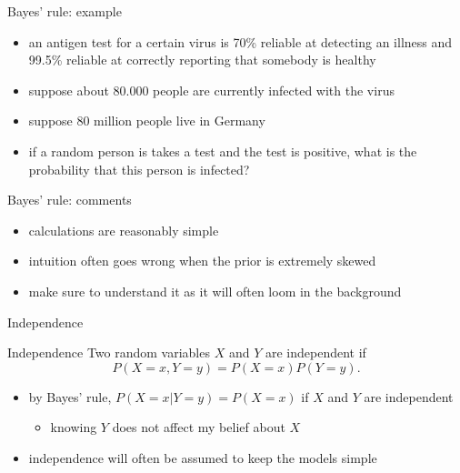 \documentclass[bigger]{beamer}
\begin{document}
\begin{frame}[label={sec:orgcfbb15d}]{Bayes' rule: example}
\begin{itemize}
\item an antigen test for a certain virus is 70\% reliable at detecting an illness and 99.5\% reliable at correctly reporting that somebody is healthy
\item suppose about 80.000 people are currently infected with the virus
\item suppose 80 million people live in Germany
\item if a random person is takes a test and the test is positive, what is the probability that this person is infected?
\end{itemize}
\end{frame}
\begin{frame}[label={sec:org8d2acd6}]{Bayes' rule: comments}
\begin{itemize}
\item calculations are reasonably simple
\item intuition often goes wrong when the prior is extremely skewed
\item make sure to understand it as it will often loom in the background
\end{itemize}
\end{frame}
\begin{frame}[label={sec:org2e23cd4}]{Independence}
\begin{block}{Independence}
Two random variables \(X\) and \(Y\) are independent if
 $$P(X=x,Y=y)=P(X=x)P(Y=y).$$
\end{block}

\begin{itemize}
\item by Bayes' rule, \(P(X=x|Y=y)=P(X=x)\) if \(X\) and \(Y\) are independent
\begin{itemize}
\item knowing \(Y\) does not affect my belief about \(X\)
\end{itemize}

\item independence will often be assumed to keep the models simple
\end{itemize}
\end{frame}
\end{document}
